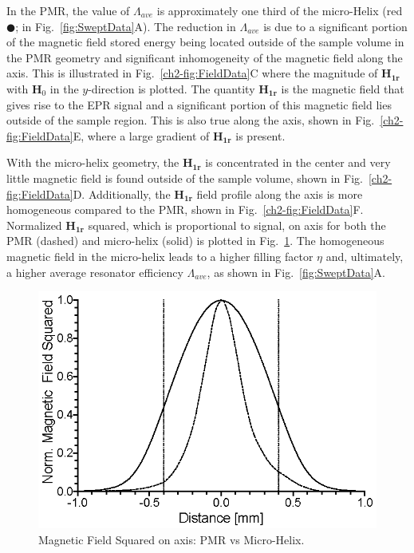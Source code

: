 In the PMR, the value of $\Lambda_{ave}$ is approximately one third of the micro-Helix (red $\CIRCLE$; in Fig.~\ref{fig:SweptData}A). The reduction in $\Lambda_{ave}$ is due to a significant portion of the magnetic field stored energy being located outside of the sample volume in the PMR geometry and significant inhomogeneity of the magnetic field along the axis. This is illustrated in Fig.~\ref{ch2-fig:FieldData}C where the magnitude of $\mathbf{H_{1r}}$ with $\mathbf{H}_0$ in the $y$-direction is plotted. The quantity $\mathbf{H_{1r}}$ is the magnetic field that gives rise to the EPR signal and a significant portion of this magnetic field lies outside of the sample region. This is also true along the axis, shown in Fig.~\ref{ch2-fig:FieldData}E, where a large gradient of $\mathbf{H_{1r}}$ is present. 

With the micro-helix geometry, the $\mathbf{H_{1r}}$ is concentrated in the center and very little magnetic field is found outside of the sample volume, shown in Fig.~\ref{ch2-fig:FieldData}D. Additionally, the $\mathbf{H_{1r}}$ field profile along the axis is more homogeneous compared to the PMR, shown in  Fig.~\ref{ch2-fig:FieldData}F. Normalized $\mathbf{H_{1r}}$ squared, which is proportional to signal, on axis for both the PMR (dashed) and micro-helix (solid) is plotted in Fig.~\ref{fig:HFSS}.  The homogeneous magnetic field in the micro-helix leads to a higher filling factor $\eta$ and, ultimately, a higher average resonator efficiency $\Lambda_{ave}$, as shown in Fig.~\ref{fig:SweptData}A. 

\begin{figure}[ht]
 \centering
 \includegraphics{Kapitel/Ch5-Images/B2OnAxis.eps}
 \caption[Magnetic Field Squared on axis: PMR vs Micro-Helix.]{Magnetic Field Squared on axis: PMR vs Micro-Helix.}
 \label{fig:HFSS}
\end{figure}

